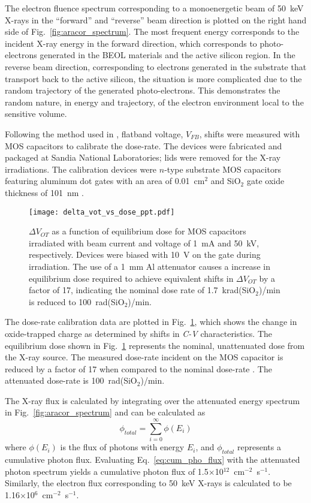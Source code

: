The electron fluence spectrum corresponding to a monoenergetic beam of 50~keV X-rays in the ``forward'' and ``reverse'' beam direction is plotted on the right hand side of Fig.~\ref{fig:aracor_spectrum}.
The most frequent energy corresponds to the incident X-ray energy in the forward direction, which corresponds to photo-electrons generated in the BEOL materials and the active silicon region.
In the reverse beam direction, corresponding to electrons generated in the substrate that transport back to the active silicon, the situation is more complicated due to the random trajectory of the generated photo-electrons. 
This demonstrates the random nature, in energy and trajectory, of the electron environment local to the sensitive volume.

Following the method used in \cite{Fleetwood:1986ug}, flatband voltage, $V_{FB}$, shifts were measured with MOS capacitors to calibrate the dose-rate. 
The devices were fabricated and packaged at Sandia National Laboratories; lids were removed for the X-ray irradiations. 
The calibration devices were $n$-type substrate MOS capacitors featuring aluminum dot gates with an area of 0.01~cm$^2$ and SiO$_2$ gate oxide thickness of 101~nm \cite{Schwank:1987fq}. 
\begin{figure}[tb]
    \centering
        \texttt{[image: delta\_vot\_vs\_dose\_ppt.pdf]}
    \caption{$\Delta V_{OT}$ as a function of equilibrium dose for MOS capacitors irradiated with beam current and voltage of 1~mA and 50~kV, respectively. Devices were biased with 10~V on the gate during irradiation. The use of a 1~mm Al attenuator causes a increase in equilibrium dose required to achieve equivalent shifts in $\Delta V_{OT}$ by a factor of 17, indicating the nominal dose rate of 1.7~krad(SiO$_2$)/min is reduced to 100~rad(SiO$_2$)/min.}
    \label{fig:delta_vot_vs_dose}
\end{figure}
The dose-rate calibration data are plotted in Fig.~\ref{fig:delta_vot_vs_dose}, which shows the change in oxide-trapped charge as determined by shifts in \emph{C-V} characteristics.
The equilibrium dose shown in Fig.~\ref{fig:delta_vot_vs_dose} represents the nominal, unattenuated dose from the X-ray source. 
The measured dose-rate incident on the MOS capacitor is reduced by a factor of 17 when compared to the nominal dose-rate \cite{Fleetwood:1986ug}. 
The attenuated dose-rate is 100~rad(SiO$_2$)/min. 

The X-ray flux is calculated by integrating over the attenuated energy spectrum in Fig.~\ref{fig:aracor_spectrum} and can be calculated as
\begin{equation}
    \label{eq:cum_pho_flux}
    \phi_{total} = \sum_{i=0}^{\infty} \phi(E_{i})
\end{equation}
where $\phi(E_{i})$ is the flux of photons with energy $E_{i}$, and $\phi_{total}$ represents a cumulative photon flux. 
Evaluating Eq.~\ref{eq:cum_pho_flux} with the attenuated photon spectrum yields a cumulative photon flux of 1.5$\times$10$^{12}$~cm$^{-2}$~s$^{-1}$.
Similarly, the electron flux corresponding to 50~keV X-rays is calculated to be 1.16$\times$10$^{6}$~cm$^{-2}$~s$^{-1}$.


